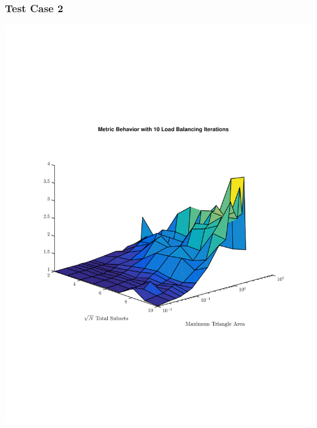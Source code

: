 \documentclass[]{beamer}
\begin{document}
\begin{frame}[t]\frametitle{Test Case 2}
\includegraphics[scale=0.47, trim = 0cm 8cm 0cm 7cm]{figures/SameIter.pdf}
\end{frame}
\end{document}

